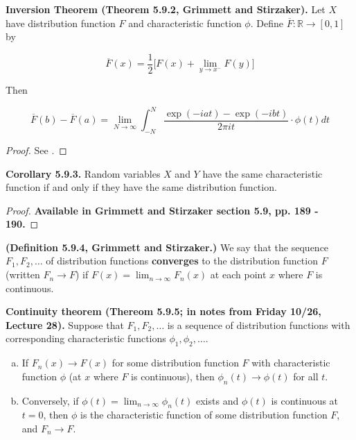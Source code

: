 \begin{theorem} \textbf{Inversion Theorem (Theorem 5.9.2, Grimmett and Stirzaker).} Let \(X\) have distribution function \(F\) and characteristic function \(\phi\). Define \(\overline{F}: \mathbb{R} \to [0, 1]\) by

\[
\overline{F}(x) = \frac{1}{2} \big[ F(x) + \lim_{y \to x^-} F(y) \big]
\]

Then

\[
\overline{F}(b) - \overline{F}(a) = \lim_{N \to \infty} \int_{-N}^N \frac{\exp(-iat) - \exp(-ibt)}{2\pi i t} \cdot \phi(t) dt
\]

\end{theorem}

\begin{proof} See \citet{kingman1966introduction}. \end{proof}

\begin{corollary} \textbf{Corollary 5.9.3.} Random variables \(X\) and \(Y\) have the same characteristic function if and only if they have the same distribution function.
\end{corollary}

\begin{proof} \textbf{Available in Grimmett and Stirzaker section 5.9, pp. 189 - 190.} \end{proof}

\begin{definition} \textbf{(Definition 5.9.4, Grimmett and Stirzaker.)} We say that the sequence \(F_1, F_2, \ldots\) of distribution functions \textbf{converges} to the distribution function \(F\) (written \(F_n \to F\)) if \(F(x) = \lim_{n\to \infty} F_n(x)\) at each point \(x\) where \(F\) is continuous.
\end{definition}

\begin{theorem}\label{asym.contin.thm}
\textbf{Continuity theorem (Thereom 5.9.5; in notes from Friday 10/26, Lecture 28).} Suppose that \(F_1, F_2, \ldots\) is a sequence of distribution functions with corresponding characteristic functions \(\phi_1, \phi_2, \ldots\). 

\begin{enumerate}[(a)]

\item If \(F_n(x) \to F(x)\) for some distribution function \(F\) with characteristic function \(\phi\) (at \(x\) where \(F\) is continuous), then \(\phi_n(t) \to \phi(t)\) for all \(t\).

\item Conversely, if \(\phi(t) = \lim_{n \to \infty} \phi_n(t)\) exists and \(\phi(t)\) is continuous at \(t = 0\), then \(\phi\) is the characteristic function of some distribution function \(F\), and \(F_n \to F\). 

\end{enumerate}
\end{theorem}

